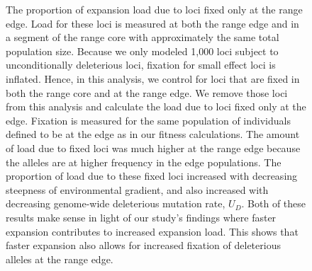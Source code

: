 \begin{figure}[h!]
\centering
{}
\caption[Load due to loci fixed at the range edge.]{The proportion of expansion load due to loci fixed only at the range edge. Load for these loci is measured at both the range edge and in a segment of the range core with approximately the same total population size. Because we only modeled 1,000 loci subject to unconditionally deleterious loci, fixation for small effect loci is inflated. Hence, in this analysis, we control for loci that are fixed in both the range core and at the range edge. We remove those loci from this analysis and calculate the load due to loci fixed only at the edge. Fixation is measured for the same population of individuals defined to be at the edge as in our fitness calculations. The amount of load due to fixed loci was much higher at the range edge because the alleles are at higher frequency in the edge populations. The proportion of load due to these fixed loci increased with decreasing steepness of environmental gradient, and also increased with decreasing genome-wide deleterious mutation rate, $U_D$. Both of these results make sense in light of our study's findings where faster expansion contributes to increased expansion load. This shows that faster expansion also allows for increased fixation of deleterious alleles at the range edge.}
\label{fig:fixedload}
\end{figure}


\newpage{}
